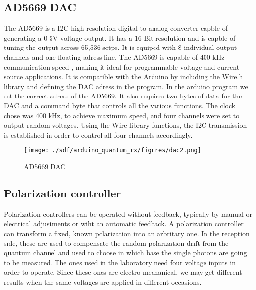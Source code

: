 \begin{refsection}
	\subsection{AD5669 DAC}
	The AD5669 is a I2C high-resolution digital to analog converter capble of generating a 0-5V voltage output. It has a 16-Bit resolution and is capble of tuning the output across 65,536 setps. It is equiped with 8 individual output channels and one floating adress line. The AD5669 is capable of 400 kHz communication speed , making it ideal for programmable voltage and current source applications. It is compatible with the Arduino by including the Wire.h library and defining the DAC adress in the program.
	In the arduino program we set the correct adress of the AD5669. It also requires two bytes of data for the DAC and a command byte that controls all the various functions. The clock chose was 400 kHz, to achieve maximum speed, and four channels were set to output random voltages. Using the Wire library functions, the I2C transmission is established in order to control all four channels accordingly.
	
		\begin{figure}[H]
		
		\centering
		\texttt{[image: ./sdf/arduino\_quantum\_rx/figures/dac2.png]}
		\caption{AD5669 DAC}
		\label{fig:netxpto}
		
	\end{figure}

	\subsection{Polarization controller}
	Polarization controllers can be operated without feedback, typically by manual or electrical adjustments or wiht an automatic feedback. A polarization controller can transform a fixed, known polarization into an arbritary one. In the reception side, these are used to compensate the random polarization drift from the quantum channel and used to choose in which base the single photons are going to be measured. The ones used in the laboratory need four voltage inputs in order to operate. Since these ones are electro-mechanical, we may get different results when the same voltages are applied in different occasions. 
	
	

\end{refsection}
